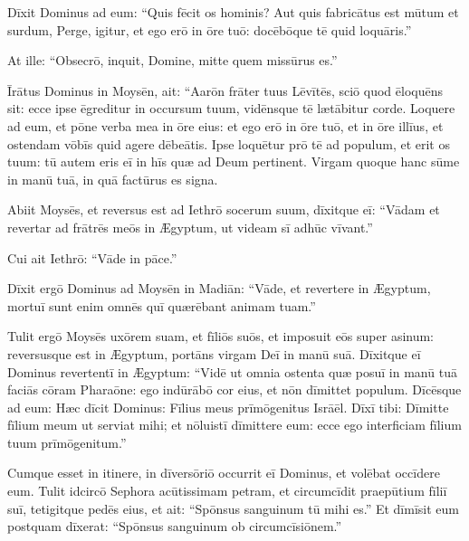 Dīxit Dominus ad eum: ``Quis fēcit os hominis?
Aut quis fabricātus est mūtum et surdum,
Perge, igitur, et ego erō in ōre tuō:
docēbōque tē quid loquāris.''

At ille: ``Obsecrō, inquit, Domine,
mitte quem missūrus es.''

Īrātus Dominus in Moysēn, ait: ``Aarōn frāter tuus Lēvītēs,
sciō quod ēloquēns sit: ecce ipse ēgreditur in occursum tuum,
vidēnsque tē lætābitur corde.
Loquere ad eum, et pōne verba mea in ōre eius:
et ego erō in ōre tuō, et in ōre illīus,
et ostendam vōbīs quid agere dēbeātis.
Ipse loquētur prō tē ad populum,
et erit os tuum:
tū autem eris eī in hīs quæ ad Deum pertinent.
Virgam quoque hanc sūme in manū tuā,
in quā factūrus es signa.

Abiit Moysēs, et reversus est ad Iethrō socerum suum,
dīxitque eī: ``Vādam et revertar ad frātrēs meōs in Ægyptum,
ut videam sī adhūc vīvant.''

Cui ait Iethrō: ``Vāde in pāce.''

Dīxit ergō Dominus ad Moysēn in Madiān: ``Vāde, et revertere in Ægyptum,
mortuī sunt enim omnēs quī quærēbant animam tuam.''

Tulit ergō Moysēs uxōrem suam, et fīliōs suōs,
et imposuit eōs super asinum: reversusque est in Ægyptum,
portāns virgam Deī in manū suā. Dīxitque eī Dominus revertentī
in Ægyptum: ``Vidē ut omnia ostenta quæ posuī in manū tuā
faciās cōram Pharaōne: ego indūrābō cor eius,
et nōn dīmittet populum. Dīcēsque ad eum: Hæc
dīcit Dominus: Fīlius meus prīmōgenitus Isrāēl.
Dīxī tibi: Dīmitte fīlium meum ut serviat mihi;
et nōluistī dīmittere eum:
ecce ego interficiam fīlium tuum prīmōgenitum.''

Cumque esset in itinere, in dīversōriō
occurrit eī Dominus, et volēbat occīdere eum. 
Tulit idcircō Sephora acūtissimam petram,
et circumcīdit praepūtium fīliī suī, tetigitque pedēs eius,
et ait: ``Spōnsus sanguinum tū mihi es.''
Et dīmīsit eum postquam dīxerat: ``Spōnsus sanguinum ob circumcīsiōnem.''

